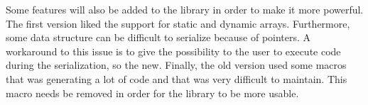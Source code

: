 Some features will also be added to the library in order to make it more
powerful. The first version liked the support for static and dynamic arrays.
Furthermore, some data structure can be difficult to serialize because of
pointers. A workaround to this issue is to give the possibility to the user to
execute code during the serialization, so the new. Finally, the old version used
some macros that was generating a lot of code and that was very difficult to
maintain. This macro needs be removed in order for the library to be more
usable.
